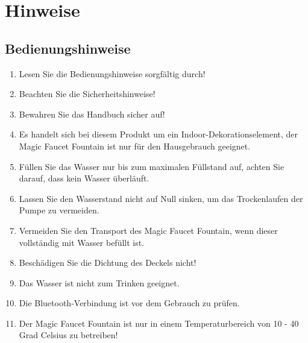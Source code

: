 %
%
%


\chapter{Hinweise}
\section{Bedienungshinweise}
\begin{enumerate}
	\item Lesen Sie die Bedienungshinweise sorgfältig durch!
	\item Beachten Sie die Sicherheitshinweise! 
	\item Bewahren Sie das Handbuch sicher auf!
	\item Es handelt sich bei diesem Produkt um ein Indoor-Dekorationselement, der Magic Faucet Fountain ist nur für den Hausgebrauch geeignet. 
	\item Füllen Sie das Wasser nur bis zum maximalen Füllstand auf, achten Sie darauf, dass kein Wasser überläuft.
	\item Lassen Sie den Wasserstand nicht auf Null sinken, um das Trockenlaufen der Pumpe zu vermeiden.
	\item Vermeiden Sie den Transport des Magic Faucet Fountain, wenn dieser vollständig mit Wasser befüllt ist.
	\item Beschädigen Sie die Dichtung des Deckels nicht!
	\item Das Wasser ist nicht zum Trinken geeignet.
	\item Die Bluetooth-Verbindung ist vor dem Gebrauch zu prüfen.
	\item Der Magic Faucet Fountain ist nur in einem Temperaturbereich von 10 - 40 Grad Celsius zu betreiben!
\end{enumerate}
\newpage
